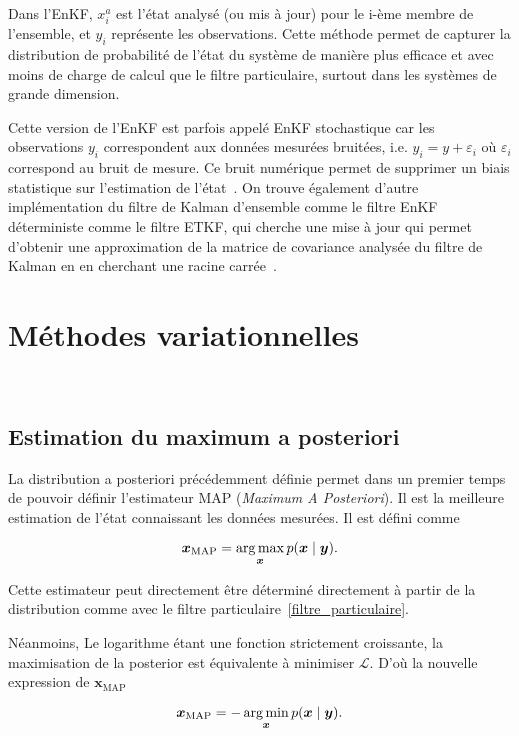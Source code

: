 Dans l'EnKF, $x_{i}^{a}$ est l'état analysé (ou mis à jour) pour le i-ème membre de l'ensemble, et $y_i$ représente les observations. Cette méthode permet de capturer la distribution de probabilité de l'état du système de manière plus efficace et avec moins de charge de calcul que le filtre particulaire, surtout dans les systèmes de grande dimension.

Cette version de l'EnKF est parfois appelé EnKF stochastique car les observations $y_i$ correspondent aux données mesurées bruitées, i.e. $y_i = y + \varepsilon_i$ où $\varepsilon_i$ correspond au bruit de mesure. Ce bruit numérique permet de supprimer un biais statistique sur l'estimation de l'état~\cite{van_leeuwen_consistent_2020}. On trouve également d'autre implémentation du filtre de Kalman d'ensemble comme le filtre EnKF déterministe comme le filtre ETKF, qui cherche une mise à jour qui permet d'obtenir une approximation de la matrice de covariance analysée du filtre de Kalman en en cherchant une racine carrée~\cite{bishop_adaptive_2001}.

\section{Méthodes variationnelles}~\label{sec:variation}
\subsection{Estimation du maximum a posteriori}

La distribution a posteriori précédemment définie permet dans un premier temps de pouvoir définir l'estimateur MAP (\textit{Maximum A Posteriori}). Il est la meilleure estimation de l'état connaissant les données mesurées. Il est défini comme

\begin{equation*}
    \bm x_{\text{MAP}} = \operatorname*{arg\,max}_{\bm x} p(\bm x \mid \bm y).
\end{equation*}

Cette estimateur peut directement être déterminé directement à partir de la distribution comme avec le filtre particulaire~\ref{filtre_particulaire}.

Néanmoins, Le logarithme étant une fonction strictement croissante, la maximisation de la posterior est équivalente à minimiser $\mathcal L$. D'où la nouvelle expression de $\bm x_{\text{MAP}}$

\begin{equation*}
    \bm x_{\text{MAP}} = - \operatorname*{arg\,min}_{\bm x} p(\bm x \mid \bm y).
\end{equation*}

